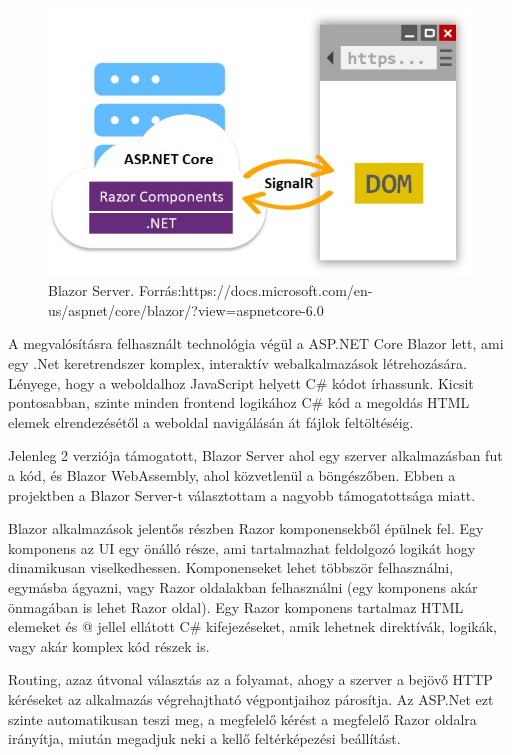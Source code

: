 
\begin{figure}[h]
\centering
\includegraphics[scale=0.5]{images/blazor.jpg}
\caption{Blazor Server. Forrás:https://docs.microsoft.com/en-us/aspnet/core/blazor/?view=aspnetcore-6.0}
\label{fig:blazor}
\end{figure}

A megvalósításra felhasznált technológia végül a ASP.NET Core Blazor lett, ami egy .Net keretrendszer komplex, interaktív webalkalmazások létrehozására. Lényege, hogy a weboldalhoz  JavaScript helyett C\# kódot írhassunk. Kicsit pontosabban, szinte minden frontend logikához C\# kód a megoldás HTML elemek elrendezésétől a weboldal navigálásán át fájlok feltöltéséig.

Jelenleg 2 verziója támogatott, Blazor Server ahol egy szerver alkalmazásban fut a kód, és Blazor WebAssembly, ahol közvetlenül a böngészőben. Ebben a projektben a Blazor Server-t választottam a nagyobb támogatottsága miatt.

Blazor alkalmazások jelentős részben Razor komponensekből épülnek fel. Egy komponens az UI egy önálló része, ami tartalmazhat feldolgozó logikát hogy dinamikusan viselkedhessen. Komponenseket lehet többször felhasználni, egymásba ágyazni, vagy Razor oldalakban felhasználni (egy komponens akár önmagában is lehet Razor oldal). Egy Razor komponens tartalmaz HTML elemeket és @ jellel ellátott C\# kifejezéseket, amik lehetnek direktívák, logikák, vagy akár komplex kód részek is.

Routing, azaz útvonal választás az a folyamat, ahogy a szerver a bejövő HTTP kéréseket az alkalmazás végrehajtható végpontjaihoz párosítja. Az ASP.Net ezt szinte automatikusan teszi meg, a megfelelő kérést a megfelelő Razor oldalra irányítja, miután megadjuk neki a kellő feltérképezési beállítást. 

